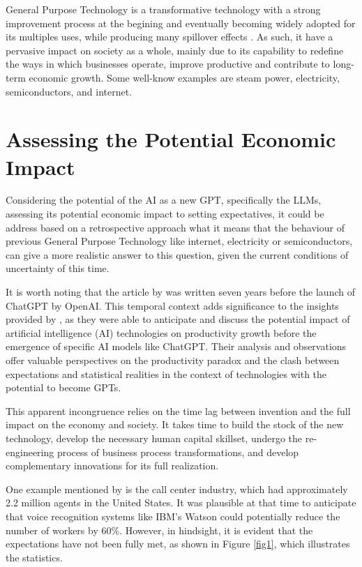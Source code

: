 \documentclass[preprint, 3p,
authoryear]{elsarticle} %
\begin{document}
General Purpose Technology is a transformative technology with a strong
improvement process at the begining and eventually becoming widely
adopted for its multiples uses, while producing many spillover effects
\citep{paradox}. As such, it have a pervasive impact on society as a
whole, mainly due to its capability to redefine the ways in which
businesses operate, improve productive and contribute to long-term
economic growth. Some well-know examples are steam power, electricity,
semiconductors, and internet.

\hypertarget{assessing-the-potential-economic-impact}{%
\section{Assessing the Potential Economic
Impact}\label{assessing-the-potential-economic-impact}}

Considering the potential of the AI as a new GPT, specifically the LLMs,
assessing its potential economic impact to setting expectatives, it
could be address based on a retrospective approach what it means that
the behaviour of previous General Purpose Technology like internet,
electricity or semiconductors, can give a more realistic answer to this
question, given the current conditions of uncertainty of this time.

It is worth noting that the article by \citep{paradox} was written seven
years before the launch of ChatGPT by OpenAI. This temporal context adds
significance to the insights provided by \citep{paradox}, as they were
able to anticipate and discuss the potential impact of artificial
intelligence (AI) technologies on productivity growth before the
emergence of specific AI models like ChatGPT. Their analysis and
observations offer valuable perspectives on the productivity paradox and
the clash between expectations and statistical realities in the context
of technologies with the potential to become GPTs.

This apparent incongruence relies on the time lag between invention and
the full impact on the economy and society. It takes time to build the
stock of the new technology, develop the necessary human capital
skillset, undergo the re-engineering process of business process
transformations, and develop complementary innovations for its full
realization.

One example mentioned by \citep{paradox} is the call center industry,
which had approximately 2.2 million agents in the United States. It was
plausible at that time to anticipate that voice recognition systems like
IBM's Watson could potentially reduce the number of workers by 60\%.
However, in hindsight, it is evident that the expectations have not been
fully met, as shown in Figure \ref{fig1}, which illustrates the
statistics.
\end{document}
